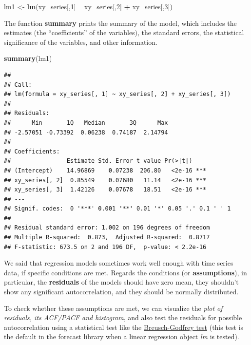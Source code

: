 \documentclass[
]{article}
\newenvironment{Shaded}{\begin{snugshade}}{\end{snugshade}}
\newcommand{\DecValTok}[1]{\textcolor[rgb]{0.00,0.00,0.81}{#1}}
\newcommand{\KeywordTok}[1]{\textcolor[rgb]{0.13,0.29,0.53}{\textbf{#1}}}
\newcommand{\NormalTok}[1]{#1}
\newcommand{\OperatorTok}[1]{\textcolor[rgb]{0.81,0.36,0.00}{\textbf{#1}}}
\newcommand{\StringTok}[1]{\textcolor[rgb]{0.31,0.60,0.02}{#1}}
\begin{document}
\begin{Shaded}
\begin{Highlighting}[]
\NormalTok{lm1 <-}\StringTok{ }\KeywordTok{lm}\NormalTok{(xy_series[,}\DecValTok{1}\NormalTok{] }\OperatorTok{~}\StringTok{ }\NormalTok{xy_series[,}\DecValTok{2}\NormalTok{] }\OperatorTok{+}\StringTok{ }\NormalTok{xy_series[,}\DecValTok{3}\NormalTok{])}
\end{Highlighting}
\end{Shaded}

The function \textbf{summary} prints the summary of the model, which includes the estimates (the ``coefficients'' of the variables), the standard errors, the statistical significance of the variables, and other information.

\begin{Shaded}
\begin{Highlighting}[]
\KeywordTok{summary}\NormalTok{(lm1)}
\end{Highlighting}
\end{Shaded}

\begin{verbatim}
## 
## Call:
## lm(formula = xy_series[, 1] ~ xy_series[, 2] + xy_series[, 3])
## 
## Residuals:
##      Min       1Q   Median       3Q      Max 
## -2.57051 -0.73392  0.06238  0.74187  2.14794 
## 
## Coefficients:
##                Estimate Std. Error t value Pr(>|t|)    
## (Intercept)    14.96869    0.07238  206.80   <2e-16 ***
## xy_series[, 2]  0.85549    0.07680   11.14   <2e-16 ***
## xy_series[, 3]  1.42126    0.07678   18.51   <2e-16 ***
## ---
## Signif. codes:  0 '***' 0.001 '**' 0.01 '*' 0.05 '.' 0.1 ' ' 1
## 
## Residual standard error: 1.002 on 196 degrees of freedom
## Multiple R-squared:  0.873,  Adjusted R-squared:  0.8717 
## F-statistic: 673.5 on 2 and 196 DF,  p-value: < 2.2e-16
\end{verbatim}

We said that regression models sometimes work well enough with time series data, if specific conditions are met. Regards the conditions (or \textbf{assumptions}), in particular, the \textbf{residuals} of the models should have zero mean, they shouldn't show any significant autocorrelation, and they should be normally distributed.

To check whether these assumptions are met, we can visualize the \emph{plot of residuals, its ACF/PACF and histogram}, and also test the residuals for possible autocorrelation using a statistical test like the \href{https://en.wikipedia.org/wiki/Breusch–Godfrey_test}{Breusch-Godfrey test} (this test is the default in the forecast library when a linear regression object \emph{lm} is tested).
\end{document}
